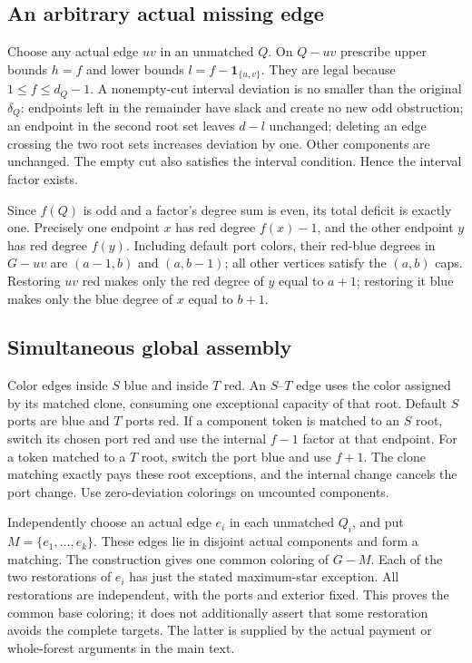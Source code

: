 \documentclass[11pt,a4paper]{article}
\theoremstyle{definition}
\begin{document}
\subsection{An arbitrary actual missing edge}
Choose any actual edge $uv$ in an unmatched $Q$. On $Q-uv$ prescribe upper bounds $h=f$ and lower bounds $l=f-\mathbf1_{\{u,v\}}$. They are legal because $1\le f\le d_Q-1$. A nonempty-cut interval deviation is no smaller than the original $\delta_Q$: endpoints left in the remainder have slack and create no new odd obstruction; an endpoint in the second root set leaves $d-l$ unchanged; deleting an edge crossing the two root sets increases deviation by one. Other components are unchanged. The empty cut also satisfies the interval condition. Hence the interval factor exists.

Since $f(Q)$ is odd and a factor's degree sum is even, its total deficit is exactly one. Precisely one endpoint $x$ has red degree $f(x)-1$, and the other endpoint $y$ has red degree $f(y)$. Including default port colors, their red-blue degrees in $G-uv$ are $(a-1,b)$ and $(a,b-1)$; all other vertices satisfy the $(a,b)$ caps. Restoring $uv$ red makes only the red degree of $y$ equal to $a+1$; restoring it blue makes only the blue degree of $x$ equal to $b+1$.

\subsection{Simultaneous global assembly}
Color edges inside $S$ blue and inside $T$ red. An $S$--$T$ edge uses the color assigned by its matched clone, consuming one exceptional capacity of that root. Default $S$ ports are blue and $T$ ports red. If a component token is matched to an $S$ root, switch its chosen port red and use the internal $f-1$ factor at that endpoint. For a token matched to a $T$ root, switch the port blue and use $f+1$. The clone matching exactly pays these root exceptions, and the internal change cancels the port change. Use zero-deviation colorings on uncounted components.

Independently choose an actual edge $e_i$ in each unmatched $Q_i$, and put $M=\{e_1,\ldots,e_k\}$. These edges lie in disjoint actual components and form a matching. The construction gives one common coloring of $G-M$. Each of the two restorations of $e_i$ has just the stated maximum-star exception. All restorations are independent, with the ports and exterior fixed. This proves the common base coloring; it does not additionally assert that some restoration avoids the complete targets. The latter is supplied by the actual payment or whole-forest arguments in the main text.
\end{document}
